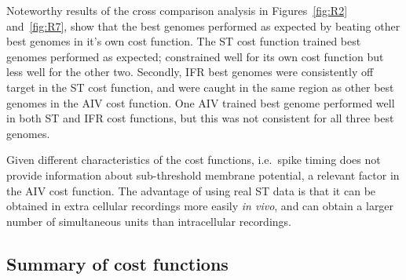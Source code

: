 
Noteworthy results of the cross comparison analysis in Figures~\ref{fig:R2}
and~\ref{fig:R7}, show that the best genomes performed as expected by
beating other best genomes in it's own cost function. The ST cost function
trained best genomes performed as expected; constrained well for its own
cost function but less well for the other two. Secondly, IFR best genomes
were consistently off target in the ST cost function, and were caught in
the same region as other best genomes in the AIV cost function. One AIV
trained best genome performed well in both ST and IFR cost functions, but
this was not consistent for all three best genomes.

Given different characteristics of the cost functions, i.e.\ spike timing
does not provide information about sub-threshold membrane potential, a
relevant factor in the AIV cost function.  The advantage of using real ST
data is that it can be obtained in extra cellular recordings more easily
\textit{in vivo}, and can obtain a larger number of simultaneous units than
intracellular recordings.



\subsection{Summary of cost functions}\label{sec:GA:summ-cost-funct}

